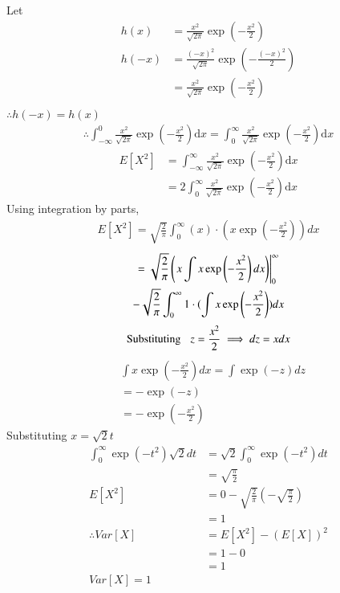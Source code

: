 \documentclass[journal,12pt,twocolumn]{IEEEtran}
\providecommand{\brak}[1]{\ensuremath{\left(#1\right)}}
\providecommand{\mean}[1]{E\left[ #1 \right]}
\numberwithin{equation}{section}
\renewcommand\thesection{\arabic{section}}
\begin{document}
\begin{enumerate}[label=\thesection.\arabic*,ref=\thesection.\theenumi]
\begin{enumerate}[label=\thesection.\arabic*,ref=\thesection.\theenumi]
Let
\begin{align}
h(x)&=\frac{x^2}{\sqrt{2\pi}}\exp\brak{-\frac{x^2}{2}} \\
h(-x)&=\frac{(-x)^2}{\sqrt{2\pi}}\exp\brak{-\frac{(-x)^2}{2}} \\
&=\frac{x^2}{\sqrt{2\pi}}\exp\brak{-\frac{x^2}{2}} \\
\end{align}
$\therefore h(-x)=h(x)$
\begin{align}
\therefore \int_{-\infty}^{0} \frac{x^2}{\sqrt{2\pi}}\exp\brak{-\frac{x^2}{2}} \mathrm{d}x=\int_{0}^{\infty} \frac{x^2}{\sqrt{2\pi}}\exp\brak{-\frac{x^2}{2}} \mathrm{d}x
\end{align}
\begin{align}
 \mean{X^2} &= \int_{-\infty}^{\infty} \frac{x^2}{\sqrt{2\pi}}\exp\brak{-\frac{x^2}{2}} \mathrm{d}x \\
&= 2 \int_{0}^{\infty} \frac{x^2}{\sqrt{2\pi}}\exp\brak{-\frac{x^2}{2}} \mathrm{d}x
	\end{align}
	Using integration by parts,
	\begin{align}
		\mean{X^2} = \sqrt{\frac{2}{\pi}}  \int_{0}^{\infty} (x) \cdot (x \exp\brak{-\frac{x^2}{2}}) dx
       \end{align}
	\begin{multline}
		= \sqrt{\frac{2}{\pi}} \brak{\left. x \int x \exp\brak{-\frac{x^2}{2}} dx}\right|_0^{\infty} \\- \sqrt{\frac{2}{\pi}}  \int_{0}^{\infty} 1 \cdot (\int x \exp\brak{-\frac{x^2}{2}})dx
	\end{multline}
	\begin{align}
     \text{Substituting} \hspace{3mm} z = \frac{x^2}{2} \implies dz = xdx\nonumber \\
      \end{align}
      \begin{align}
		&\int x \exp\brak{-\frac{x^2}{2}} dx = \int \exp(-z) dz \\
		&= - \exp(-z)  \\
		&= - \exp\brak{-\frac{x^2}{2}} 
\end{align}
Substituting $x = \sqrt{2} t$ 
\begin{align}
\int_0^{\infty} \exp(-t^2) \sqrt{2} dt &= {\sqrt{2}}
\int_0^{\infty} \exp(-t^2) dt \\
		&=\sqrt{\frac{\pi}{2}}\\
E[X^2] &= 0 - \sqrt{\frac{2}{\pi}} \brak{- \sqrt{\frac{\pi}{2}}} \\
		&= 1 \\
\therefore Var[X] &= \mean{X^2} - \brak{\mean{X}}^2 \\
		&= 1 - 0  \\
            &= 1\\
Var[X]=1
\end{align}
	\end{enumerate}


\end{enumerate}
\end{document}
